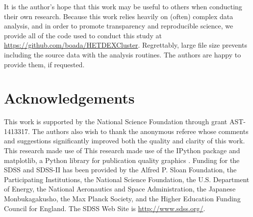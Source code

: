 \documentclass[fleqn,usenatbib]{mnras}
\begin{document}
It is the author's hope that this work may be useful to others when conducting their own research. Because this work relies heavily on (often) complex data analysis, and in order to promote transparency and reproducible science, we provide all of the code used to conduct this study at \url{https://github.com/boada/HETDEXCluster}. Regrettably, large file size prevents including the source data with the analysis routines. The authors are happy to provide them, if requested.

\section*{Acknowledgements}
This work is supported by the National Science Foundation through grant AST-1413317. The authors also wish to thank the anonymous referee whose comments and suggestions significantly improved both the quality and clarity of this work. This research made use of This research made use of the {\sc IPython} package \citep{Perez2007} and {\sc matplotlib}, a Python library for publication quality graphics \citep{Hunter2007}. Funding for the SDSS and SDSS-II has been provided by the Alfred P. Sloan Foundation, the Participating Institutions, the National Science Foundation, the U.S. Department of Energy, the National Aeronautics and Space Administration, the Japanese Monbukagakusho, the Max Planck Society, and the Higher Education Funding Council for England. The SDSS Web Site is \url{http://www.sdss.org/}.



%
%

\bsp	%
\label{lastpage}
\end{document}
